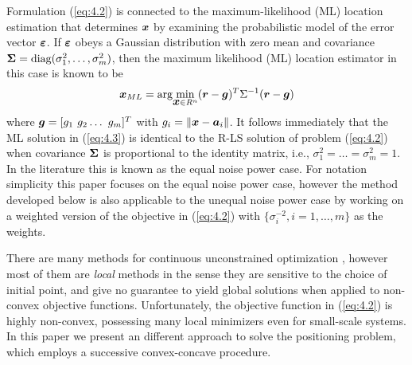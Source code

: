 Formulation (\ref{eq:4.2}) is connected to the maximum-likelihood (ML) location estimation that determines $\mbox{\boldmath$x$}$ by examining the probabilistic model of the error vector $\mbox{\boldmath${\varepsilon}$}$. If $\mbox{\boldmath${\varepsilon}$}$ obeys a Gaussian distribution with zero mean and covariance $\mbox{\boldmath${\Sigma}$} = \mbox{diag}(\sigma_1^2, \ldots, \sigma_m^2)$, then the maximum likelihood (ML) location estimator in this case is known to be
\begin{equation} \label{eq:4.3}%
\Bx_{ML} = \mbox{arg}\!\min_{{\Bx} \in R^n} (\Br - \Bg)^T\Sigma^{-1}(\Br - \Bg)
\end{equation}
where $\mbox{\boldmath$g$} = [g_1 \ g_2 \ldots \ g_m]^T$ with $g_i = \|{\mbox{\boldmath$x$}} - {\mbox{\boldmath$a$}}_i\|$. It follows immediately that the ML solution in (\ref{eq:4.3}) is identical to the R-LS solution of problem (\ref{eq:4.2}) when covariance $\mbox{\boldmath${\Sigma}$}$ is proportional to the identity matrix, i.e., $\sigma_1^2=\ldots =\sigma_m^2 = 1$. In the literature this is known as the equal noise power case. For notation simplicity this paper focuses on the equal noise power case, however the method developed below is also applicable to the unequal noise power case by working on a weighted version of the objective in  (\ref{eq:4.2})  with $\{\sigma_i^{-2}, i = 1, \ldots, m\}$ as the weights.


 There are many methods for continuous unconstrained optimization \cite{AntonLu}, however most of them are \textit{local} methods in the sense they are sensitive to the choice of initial point, and give no guarantee to yield global solutions when applied to non-convex objective functions. Unfortunately, the objective function in (\ref{eq:4.2}) is highly non-convex, possessing many local minimizers even for small-scale systems. In this paper we present an different approach to solve the positioning problem, which employs a successive convex-concave procedure.

%

